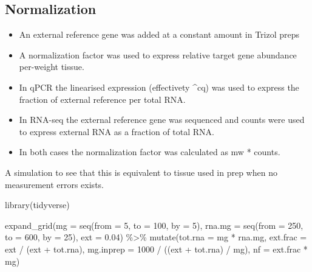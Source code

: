 \documentclass[twoside,10pt]{gihclass} %
\newenvironment{Shaded}{\begin{snugshade}}{\end{snugshade}}
\newcommand{\AttributeTok}[1]{\textcolor[rgb]{0.77,0.63,0.00}{#1}}
\newcommand{\DecValTok}[1]{\textcolor[rgb]{0.00,0.00,0.81}{#1}}
\newcommand{\FloatTok}[1]{\textcolor[rgb]{0.00,0.00,0.81}{#1}}
\newcommand{\FunctionTok}[1]{\textcolor[rgb]{0.00,0.00,0.00}{#1}}
\newcommand{\NormalTok}[1]{#1}
\newcommand{\SpecialCharTok}[1]{\textcolor[rgb]{0.00,0.00,0.00}{#1}}
\providecommand{\tightlist}{%
  \setlength{\itemsep}{0pt}\setlength{\parskip}{0pt}}
\begin{document}
\hypertarget{normalization}{%
\subsection{Normalization}\label{normalization}}
\begin{itemize}
\tightlist
\item
  An external reference gene was added at a constant amount in Trizol
  preps
\item
  A normalization factor was used to express relative target gene
  abundance per-weight tissue.
\item
  In qPCR the linearised expression (effectivety \^{}cq) was used to
  express the fraction of external reference per total RNA.
\item
  In RNA-seq the external reference gene was sequenced and counts were
  used to express external RNA as a fraction of total RNA.
\item
  In both cases the normalization factor was calculated as mw *
  counts.
\end{itemize}
A simulation to see that this is equivalent to tissue used in prep when
no measurement errors exists.
\begin{Shaded}
\begin{Highlighting}[]
\FunctionTok{library}\NormalTok{(tidyverse)}

\FunctionTok{expand\_grid}\NormalTok{(}\AttributeTok{mg =} \FunctionTok{seq}\NormalTok{(}\AttributeTok{from =} \DecValTok{5}\NormalTok{, }\AttributeTok{to =} \DecValTok{100}\NormalTok{, }\AttributeTok{by =} \DecValTok{5}\NormalTok{), }
            \AttributeTok{rna.mg =} \FunctionTok{seq}\NormalTok{(}\AttributeTok{from =} \DecValTok{250}\NormalTok{, }\AttributeTok{to =} \DecValTok{600}\NormalTok{, }\AttributeTok{by =} \DecValTok{25}\NormalTok{),}
            \AttributeTok{ext =} \FloatTok{0.04}\NormalTok{) }\SpecialCharTok{\%\textgreater{}\%}
  \FunctionTok{mutate}\NormalTok{(}\AttributeTok{tot.rna =}\NormalTok{ mg }\SpecialCharTok{*}\NormalTok{ rna.mg, }
         \AttributeTok{ext.frac =}\NormalTok{ ext }\SpecialCharTok{/}\NormalTok{ (ext }\SpecialCharTok{+}\NormalTok{ tot.rna), }
         \AttributeTok{mg.inprep =} \DecValTok{1000} \SpecialCharTok{/}\NormalTok{ ((ext }\SpecialCharTok{+}\NormalTok{ tot.rna) }\SpecialCharTok{/}\NormalTok{ mg), }
         \AttributeTok{nf =}\NormalTok{ ext.frac }\SpecialCharTok{*}\NormalTok{ mg) }
\end{Highlighting}
\end{Shaded}
\end{document}
